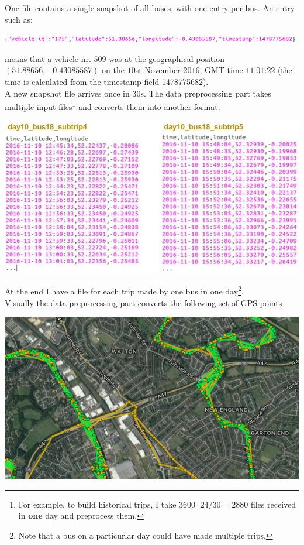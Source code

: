 \documentclass[12pt,a4paper,oneside,openright]{report}
\begin{document}
One file contains a single snapshot of all buses, 
with one entry per bus. An entry such as:

\includegraphics[width=\textwidth]{figs/entry.png}

means that a vehicle nr. $509$ was at the geographical position
$(51.88656, -0.43085587)$ on the $10$st November $2016$, GMT time
$11$:$01$:$22$ (the time is calculated from the timestamp field 1478775682). \\

A new snapshot file arrives once in $30$s. The data preprocessing part
takes multiple input files\footnote{For example, to build historical trips, I take $3600 \cdot 24 / 30 = 2880$ files
received in \textbf{one} day and preprocess them.} and converts them into another format:

\includegraphics[width=\textwidth]{figs/converted_format.jpg}

At the end I have a file for each trip made by one bus in one
day\footnote{Note that a bus on a particurlar day could have made
multiple trips.}. \\

Visually the data preprocessing part converts the following set of GPS points

\includegraphics[width=\textwidth]{figs/unprocessed.png} \\
\end{document}

